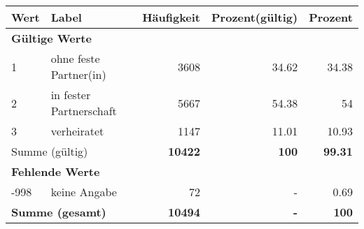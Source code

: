      \begin{longtable}{lXrrr}
     \toprule
     \textbf{Wert} & \textbf{Label} & \textbf{Häufigkeit} & \textbf{Prozent(gültig)} & \textbf{Prozent} \\
     \endhead
     \midrule
     \multicolumn{5}{l}{\textbf{Gültige Werte}}\\

     1 &
     \multicolumn{1}{X}{ ohne feste Partner(in)   } &


       \num{3608} &
       \num[round-mode=places,round-precision=2]{34,62} &
         \num[round-mode=places,round-precision=2]{34,38} \\

     2 &
     \multicolumn{1}{X}{ in fester Partnerschaft   } &


       \num{5667} &
       \num[round-mode=places,round-precision=2]{54,38} &
         \num[round-mode=places,round-precision=2]{54} \\

     3 &
     \multicolumn{1}{X}{ verheiratet   } &


       \num{1147} &
       \num[round-mode=places,round-precision=2]{11,01} &
         \num[round-mode=places,round-precision=2]{10,93} \\
     \midrule
     \multicolumn{2}{l}{Summe (gültig)} &
       \textbf{\num{10422}} &
     \textbf{100} &
       \textbf{\num[round-mode=places,round-precision=2]{99,31}} \\
     \multicolumn{5}{l}{\textbf{Fehlende Werte}}\\
       -998 &
       keine Angabe &
         \num{72} &
        - &
         \num[round-mode=places,round-precision=2]{0,69} \\
     \midrule
     \multicolumn{2}{l}{\textbf{Summe (gesamt)}} &
          \textbf{\num{10494}} &
        \textbf{-} &
        \textbf{100} \\
     \bottomrule
     \end{longtable}
     
